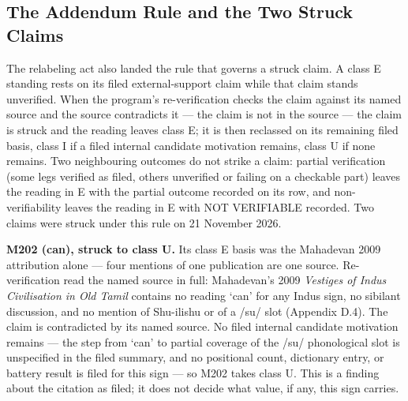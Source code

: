 \documentclass[11pt]{article}
\newcounter{none} %
\begin{document}
\subsection{The Addendum Rule and the Two Struck
Claims}\label{appendix-d3-strikes}

The relabeling act also landed the rule that governs a struck
claim. A class E standing rests on its filed external-support
claim while that claim stands unverified. When the program's
re-verification checks the claim against its named source and
the source contradicts it --- the claim is not in the source ---
the claim is struck and the reading leaves class E; it is then
reclassed on its remaining filed basis, class I if a filed
internal candidate motivation remains, class U if none remains.
Two neighbouring outcomes do not strike a claim: partial
verification (some legs verified as filed, others unverified or
failing on a checkable part) leaves the reading in E with the
partial outcome recorded on its row, and non-verifiability
leaves the reading in E with NOT VERIFIABLE recorded. Two claims
were struck under this rule on 21 November 2026.

\textbf{M202 (can), struck to class U.} Its class E basis was
the Mahadevan 2009 attribution alone --- four mentions of one
publication are one source. Re-verification read the named
source in full: Mahadevan's 2009 \emph{Vestiges of Indus
Civilisation in Old Tamil} contains no reading `can' for any
Indus sign, no sibilant discussion, and no mention of Shu-ilishu
or of a /su/ slot (Appendix D.4). The claim is contradicted by
its named source. No filed internal candidate motivation
remains --- the step from `can' to partial coverage of the /su/
phonological slot is unspecified in the filed summary, and no
positional count, dictionary entry, or battery result is filed
for this sign --- so M202 takes class U. This is a finding about
the citation as filed; it does not decide what value, if any,
this sign carries.
\end{document}
